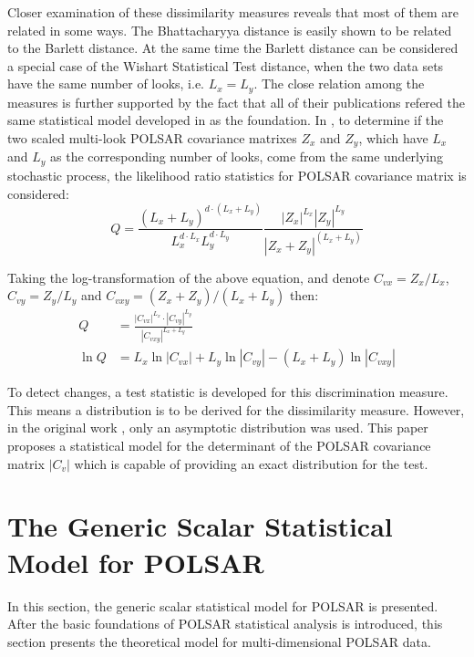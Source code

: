 \documentclass[journal]{IEEEtran}
\begin{document}
Closer examination of these dissimilarity measures reveals that most of them are related in some ways. %
The Bhattacharyya distance is easily shown to be related to the Barlett distance.
At the same time the Barlett distance can be considered a special case of the Wishart Statistical Test distance,
  when the two data sets have the same number of looks, i.e. $L_x=L_y$.
The close relation among the measures is further supported by the fact that
  all of their publications refered the same statistical model developed in \cite{Conradsen_2003_TGRS_4} as the foundation.
In \cite{Conradsen_2003_TGRS_4}, to determine if the two scaled multi-look POLSAR covariance matrixes $Z_x$ and $Z_y$,
  which have $L_x$ and $L_y$ as the corresponding number of looks,
  come from the same underlying stochastic process,
the likelihood ratio statistics for POLSAR covariance matrix is considered:  
\begin{equation*}
  Q = \frac{(L_x+L_y)^{d \cdot (L_x+L_y)}}{L_x^{d \cdot L_x} L_y^{d \cdot L_y}} \frac{|Z_x|^{L_x} |Z_y|^{L_y} }{|Z_x+Z_y|^{(L_x+L_y)}}
\end{equation*}

Taking the log-transformation of the above equation, and denote $C_{vx} = Z_x / L_x$, $C_{vy} = Z_y / L_y$ and $C_{vxy} = (Z_x + Z_y)/(L_x + L_y)$ then:
{\small
\begin{align}
  Q &= \frac{|C_{vx}|^{L_x} \cdot |C_{vy}|^{L_y} }{|C_{vxy}|^{L_x + L_y}} \label{eqn:ori_likelyhood_stats} \\
  \ln Q &= L_x \ln |C_{vx}| + L_y \ln |C_{vy}| - (L_x + L_y) \ln |C_{vxy}| \label{eqn:log_likelyhood_stats}
\end{align}
}

To detect changes, a test statistic is developed for this discrimination measure.
This means a distribution is to be derived for the dissimilarity measure.
However, in the original work \cite{Conradsen_2003_TGRS_4}, only an asymptotic distribution was used.
This paper proposes a statistical model for the determinant of the POLSAR covariance matrix $|C_v|$
  which is capable of providing an exact distribution for the test.

\section{The Generic Scalar Statistical Model for POLSAR}  
\label{sec:theoretical_model}

In this section, the generic scalar statistical model for POLSAR is presented.
After the basic foundations of POLSAR statistical analysis is introduced,
  this section presents the theoretical model for multi-dimensional POLSAR data. 
\end{document}
